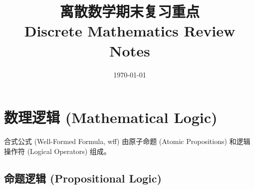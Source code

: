 \documentclass[a4paper,12pt]{ctexart}
\title{\bfseries 离散数学期末复习重点 \\ Discrete Mathematics Review Notes}
\author{}
\date{\today}
\begin{document}
\maketitle
\tableofcontents
\newpage

\section{数理逻辑 (Mathematical Logic)}

合式公式 (Well-Formed Formula, wff) 由原子命题 (Atomic Propositions) 和逻辑操作符 (Logical Operators) 组成。

\subsection{命题逻辑 (Propositional Logic)}
\end{document}

